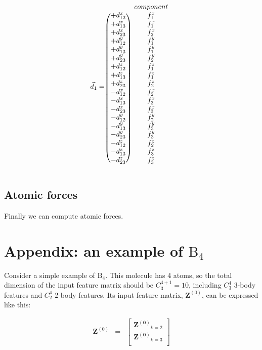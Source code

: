 \documentclass{article}
\begin{document}
\begin{equation}
\vec{d}_{1} = \begin{blockarray}{cc}
              & component \\
\begin{block}{(c)c}
	+d^x_{12} & f^x_1 \\
	+d^x_{13} & f^x_1 \\
	+d^x_{23} & f^x_2 \\
	+d^y_{12} & f^y_1 \\
	+d^y_{13} & f^y_1 \\
	+d^y_{23} & f^y_2 \\
	+d^z_{12} & f^z_1 \\
	+d^z_{13} & f^z_1 \\
	+d^z_{23} & f^z_2 \\
	-d^x_{12} & f^x_2 \\
	-d^x_{13} & f^x_3 \\
	-d^x_{23} & f^x_3 \\
	-d^y_{12} & f^y_2 \\
	-d^y_{13} & f^y_3 \\
	-d^y_{23} & f^y_3 \\
	-d^z_{12} & f^z_2 \\
	-d^z_{13} & f^z_3 \\
	-d^z_{23} & f^z_3 \\
\end{block}
\end{blockarray}
\end{equation}

\subsection{Atomic forces}

Finally we can compute atomic forces.



\newpage

\section*{Appendix: an example of $\mathrm{B}_4$}

Consider a simple example of $\mathrm{B}_{4}$. This molecule has 4 atoms, so the total 
dimension of the input feature matrix should be $C^{4+1}_3=10$, including $C^4_3$ 3-body 
features and $C^4_2$ 2-body features.
Its input feature matrix, $\mathbf{Z}^{(0)}$, can be expressed like this:

\begin{eqnarray}
\mathbf{Z}^{(0)} & = & \left[\begin{array}{c}
	\mathbf{Z^{(0)}}_{k=2} \\
	\mathbf{Z^{(0)}}_{k=3} \\
\end{array}
\right]
\end{eqnarray}
\end{document}
